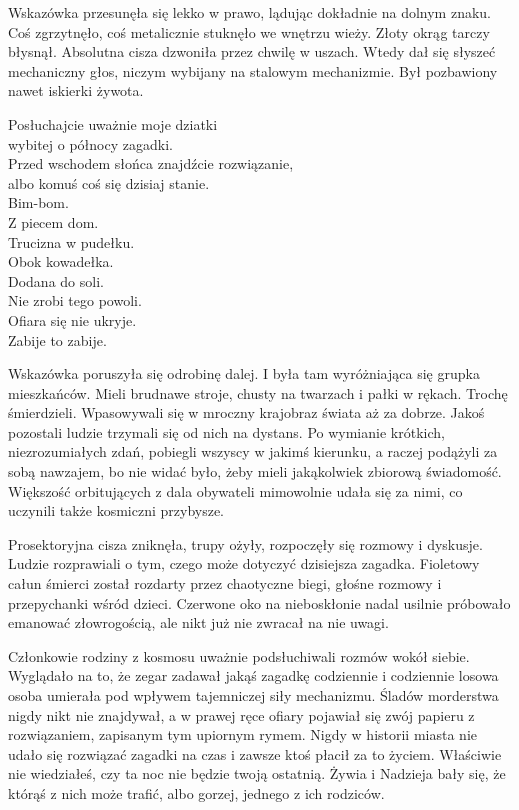 Wskazówka przesunęła się lekko w prawo, lądując dokładnie na dolnym znaku. 
Coś zgrzytnęło, coś metalicznie stuknęło we wnętrzu wieży.
Złoty okrąg tarczy błysnął.
Absolutna cisza dzwoniła przez chwilę w uszach.
Wtedy dał się słyszeć mechaniczny głos, niczym wybijany na stalowym mechanizmie.
Był pozbawiony nawet iskierki żywota.

\begin{poem}
	Posłuchajcie uważnie moje dziatki \\
	wybitej o północy zagadki. \\
	Przed wschodem słońca znajdźcie rozwiązanie, \\
	albo komuś coś się dzisiaj stanie. \\
	Bim-bom. \\
	Z piecem dom. \\
	Trucizna w pudełku. \\
	Obok kowadełka. \\
	Dodana do soli. \\
	Nie zrobi tego powoli. \\
	Ofiara się nie ukryje. \\
	Zabije to zabije. \\
\end{poem}

Wskazówka poruszyła się odrobinę dalej.
I była tam wyróżniająca się grupka mieszkańców.
Mieli brudnawe stroje, chusty na twarzach i pałki w rękach. Trochę śmierdzieli.
Wpasowywali się w mroczny krajobraz świata aż za dobrze.
Jakoś pozostali ludzie trzymali się od nich na dystans.
Po wymianie krótkich, niezrozumiałych zdań, pobiegli wszyscy w jakimś kierunku, a raczej podążyli za sobą nawzajem, bo nie widać było, żeby mieli jakąkolwiek zbiorową świadomość.
Większość orbitujących z dala obywateli mimowolnie udała się za nimi, co uczynili także kosmiczni przybysze.

Prosektoryjna cisza zniknęła, trupy ożyły, rozpoczęły się rozmowy i dyskusje.
Ludzie rozprawiali o tym, czego może dotyczyć dzisiejsza zagadka.
Fioletowy całun śmierci został rozdarty przez chaotyczne biegi, głośne rozmowy i przepychanki wśród dzieci.
Czerwone oko na nieboskłonie nadal usilnie próbowało emanować złowrogością, ale nikt już nie zwracał na nie uwagi.

Członkowie rodziny z kosmosu uważnie podsłuchiwali rozmów wokół siebie.
Wyglądało na to, że zegar zadawał jakąś zagadkę codziennie i codziennie losowa osoba umierała pod wpływem tajemniczej siły mechanizmu.
Śladów morderstwa nigdy nikt nie znajdywał, a w prawej ręce ofiary pojawiał się zwój papieru z rozwiązaniem, zapisanym tym upiornym rymem.
Nigdy w historii miasta nie udało się rozwiązać zagadki na czas i zawsze ktoś płacił za to życiem.
Właściwie nie wiedziałeś, czy ta noc nie będzie twoją ostatnią. 
Żywia i Nadzieja bały się, że którąś z nich może trafić, albo gorzej, jednego z ich rodziców.

